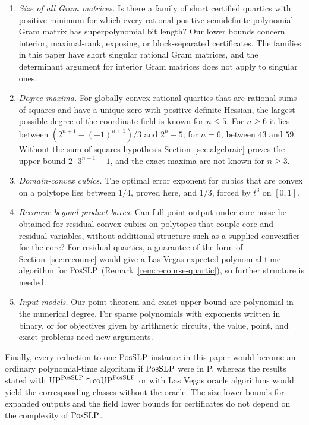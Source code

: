\begin{enumerate}[label=\arabic*.,leftmargin=*]
  zero of the tower family it reduces to rational linear algebra and one
  semidefiniteness test (Section~\ref{sec:fields}), but in general the zero
  is unknown and the answer depends on its coordinate field.
\item \emph{Size of all Gram matrices.} Is there a family of short certified
  quartics with positive minimum for which every rational positive
  semidefinite polynomial Gram matrix has superpolynomial bit length? Our
  lower bounds concern interior, maximal-rank, exposing, or block-separated
  certificates. The families in this paper have short singular rational Gram
  matrices, and the determinant argument for interior Gram matrices does not
  apply to singular ones.
\item \emph{Degree maxima.} For globally convex rational quartics that are
  rational sums of squares and have a unique zero with positive definite
  Hessian, the largest possible degree of the coordinate field is known for
  $n\le5$. For $n\ge6$ it lies between $(2^{n+1}-(-1)^{n+1})/3$ and $2^n-5$;
  for $n=6$, between $43$ and $59$. Without the sum-of-squares hypothesis
  Section~\ref{sec:algebraic} proves the upper bound $2\cdot3^{n-1}-1$, and the
  exact maxima are not known for $n\ge3$.
\item \emph{Domain-convex cubics.} The optimal error exponent for cubics that
  are convex on a polytope lies between $1/4$, proved here, and $1/3$, forced
  by $t^3$ on $[0,1]$.
\item \emph{Recourse beyond product boxes.} Can full point output under core
  noise be obtained for residual-convex cubics on polytopes that couple core
  and residual variables, without additional structure such as a supplied
  convexifier for the core? For residual quartics, a guarantee of
  the form of Section~\ref{sec:recourse} would give a Las Vegas expected
  polynomial-time algorithm for $\mathrm{PosSLP}$ (Remark~\ref{rem:recourse-quartic}),
  so further structure is needed.
\item \emph{Input models.} Our point theorem and exact upper bound are
  polynomial in the numerical degree. For sparse polynomials with
  exponents written in binary, or for objectives given by arithmetic
  circuits, the value, point, and exact problems need new arguments.
\end{enumerate}

Finally, every reduction to one $\mathrm{PosSLP}$ instance in this paper would become
an ordinary polynomial-time algorithm if $\mathrm{PosSLP}$ were in P, whereas the
results stated with $\mathrm{UP}^{\mathrm{PosSLP}}\cap\mathrm{coUP}^{\mathrm{PosSLP}}$ or with
Las Vegas oracle algorithms would yield the corresponding classes without the
oracle. The size lower bounds for expanded outputs and the field lower bounds
for certificates do not depend on the complexity of $\mathrm{PosSLP}$.
